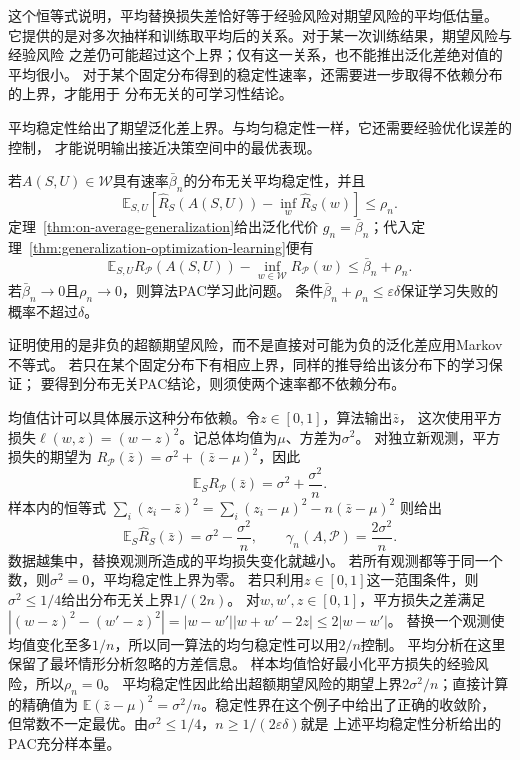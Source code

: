 这个恒等式说明，平均替换损失差恰好等于经验风险对期望风险的平均低估量。
它提供的是对多次抽样和训练取平均后的关系。对于某一次训练结果，期望风险与经验风险
之差仍可能超过这个上界；仅有这一关系，也不能推出泛化差绝对值的平均很小。
对于某个固定分布得到的稳定性速率，还需要进一步取得不依赖分布的上界，才能用于
分布无关的可学习性结论。

平均稳定性给出了期望泛化差上界。与均匀稳定性一样，它还需要经验优化误差的控制，
才能说明输出接近决策空间中的最优表现。

若$A(S,U)\in\mathcal W$具有速率$\bar\beta_n$的分布无关平均稳定性，并且
\[
 \mathbb E_{S,U}[\hat R_S(A(S,U))-\inf_w\hat R_S(w)]\leq\rho_n.
\]
定理~\ref{thm:on-average-generalization}给出泛化代价
$g_n=\bar\beta_n$；代入定理~\ref{thm:generalization-optimization-learning}便有
\begin{equation}
 \mathbb E_{S,U}R_{\mathcal P}(A(S,U))-
 \inf_{w\in\mathcal W}R_{\mathcal P}(w)\leq\bar\beta_n+\rho_n.
 \label{eq:stability-excess-risk}
\end{equation}
若$\bar\beta_n\to0$且$\rho_n\to0$，则算法PAC学习此问题。
条件$\bar\beta_n+\rho_n\leq\varepsilon\delta$保证学习失败的概率不超过$\delta$。

证明使用的是非负的超额期望风险，而不是直接对可能为负的泛化差应用Markov不等式。
若只在某个固定分布下有相应上界，同样的推导给出该分布下的学习保证；
要得到分布无关PAC结论，则须使两个速率都不依赖分布。

均值估计可以具体展示这种分布依赖。令$z\in[0,1]$，算法输出$\bar z$，
这次使用平方损失$\ell(w,z)=(w-z)^2$。记总体均值为$\mu$、方差为$\sigma^2$。
对独立新观测，平方损失的期望为
$R_{\mathcal P}(\bar z)=\sigma^2+(\bar z-\mu)^2$，因此
\[
 \mathbb E_S R_{\mathcal P}(\bar z)=\sigma^2+\frac{\sigma^2}{n}.
\]
样本内的恒等式
$\sum_i(z_i-\bar z)^2=\sum_i(z_i-\mu)^2-n(\bar z-\mu)^2$
则给出
\[
 \mathbb E_S\hat R_S(\bar z)=\sigma^2-\frac{\sigma^2}{n},
 \qquad \gamma_n(A,\mathcal P)=\frac{2\sigma^2}{n}.
\]
数据越集中，替换观测所造成的平均损失变化就越小。
若所有观测都等于同一个数，则$\sigma^2=0$，平均稳定性上界为零。
若只利用$z\in[0,1]$这一范围条件，则$\sigma^2\leq1/4$给出分布无关上界$1/(2n)$。
对$w,w',z\in[0,1]$，平方损失之差满足
$|(w-z)^2-(w'-z)^2|=|w-w'||w+w'-2z|\leq2|w-w'|$。
替换一个观测使均值变化至多$1/n$，所以同一算法的均匀稳定性可以用$2/n$控制。
平均分析在这里保留了最坏情形分析忽略的方差信息。
样本均值恰好最小化平方损失的经验风险，所以$\rho_n=0$。
平均稳定性因此给出超额期望风险的期望上界$2\sigma^2/n$；直接计算的精确值为
$\mathbb E(\bar z-\mu)^2=\sigma^2/n$。稳定性界在这个例子中给出了正确的收敛阶，
但常数不一定最优。由$\sigma^2\leq1/4$，$n\geq1/(2\varepsilon\delta)$就是
上述平均稳定性分析给出的PAC充分样本量。

